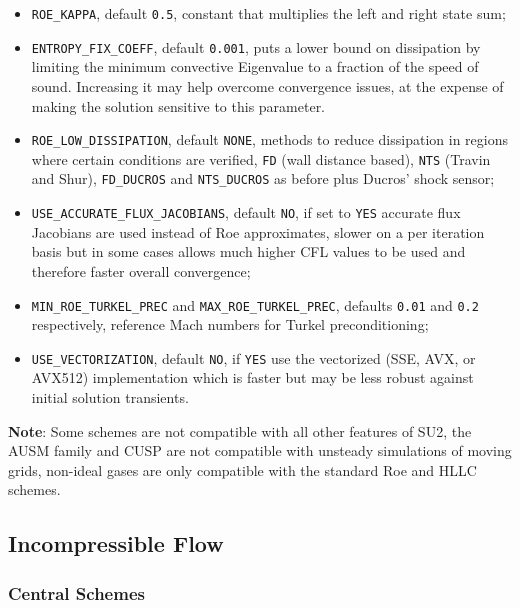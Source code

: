 \documentclass[12pt, a4paper, twoside]{article}
\begin{document}
\fi






\begin{itemize}
    \item \verb|ROE_KAPPA|, default \verb|0.5|, constant that multiplies the left and right state sum;
    \item \verb|ENTROPY_FIX_COEFF|, default \verb|0.001|, puts a lower bound on dissipation by limiting the minimum convective Eigenvalue to a fraction of the speed of sound. Increasing it may help overcome convergence issues, at the expense of making the solution sensitive to this parameter.
    \item \verb|ROE_LOW_DISSIPATION|, default \verb|NONE|, methods to reduce dissipation in regions where certain conditions are verified, \verb|FD| (wall distance based), \verb|NTS| (Travin and Shur), \verb|FD_DUCROS| and \verb|NTS_DUCROS| as before plus Ducros’ shock sensor;
    \item \verb|USE_ACCURATE_FLUX_JACOBIANS|, default \verb|NO|, if set to \verb|YES| accurate flux Jacobians are used instead of Roe approximates, slower on a per iteration basis but in some cases allows much higher CFL values to be used and therefore faster overall convergence;
    \item \verb|MIN_ROE_TURKEL_PREC| and \verb|MAX_ROE_TURKEL_PREC|, defaults \verb|0.01| and \verb|0.2| respectively, reference Mach numbers for Turkel preconditioning;
    \item \verb|USE_VECTORIZATION|, default \verb|NO|, if \verb|YES| use the vectorized (SSE, AVX, or AVX512) implementation which is faster but may be less robust against initial solution transients.
    
\end{itemize}
   
\textbf{Note}: Some schemes are not compatible with all other features of SU2, the AUSM family and CUSP are not compatible with unsteady simulations of moving grids, non-ideal gases are only compatible with the standard Roe and HLLC schemes.


\subsection{Incompressible Flow}
\subsubsection{Central Schemes}
\end{document}

